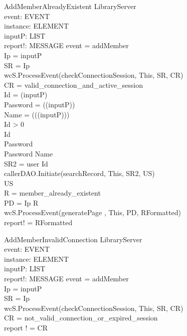 \begin{schema}{AddMemberAlreadyExistent} 
\Delta LibraryServer \\
event: EVENT \\
instance: ELEMENT \\
inputP: LIST \\
report!: MESSAGE
\where event = addMember \\
Ip = \head inputP \\
SR = \lseq Ip \rseq \\ 
wcS.ProcessEvent(checkConnectionSession, This, SR, CR) \\
CR = valid\_connection\_and\_active\_session \\
Id = \head (\tail inputP) \\
Password = \head (\tail (\tail inputP)) \\
Name = \head (\tail (\tail (\tail inputP))) \\
Id > 0 \\
Id  \\
Password  \\
Password \neq Name \\
SR2 = \lseq user Id \rseq \\
callerDAO.Initiate(searchRecord, This, SR2, US) \\
US \neq \emptyset \\
R = member\_already\_existent \\
PD = \lseq Ip R \rseq \\
wcS.ProcessEvent(generatePage , This, PD, RFormatted) \\
report! = RFormatted
\end{schema}

\begin{schema}{AddMemberInvalidConnection}
\Xi LibraryServer \\
event: EVENT \\
instance: ELEMENT \\
inputP: LIST \\
report!: MESSAGE
\where event = addMember \\
Ip = \head inputP \\
SR = \lseq Ip \rseq \\ 
wcS.ProcessEvent(checkConnectionSession, This, SR, CR) \\
CR = not\_valid\_connection\_or\_expired\_session \\ 
report ! = CR
\end{schema}

